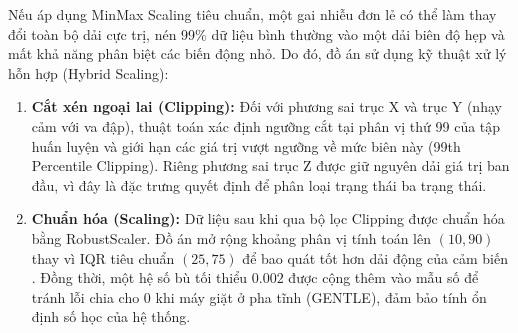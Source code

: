 Nếu áp dụng MinMax Scaling tiêu chuẩn, một gai nhiễu đơn lẻ có thể làm thay đổi toàn bộ dải cực trị, nén 99\% dữ liệu bình thường vào một dải biên độ hẹp và mất khả năng phân biệt các biến động nhỏ. Do đó, đồ án sử dụng kỹ thuật xử lý hỗn hợp (Hybrid Scaling):

\begin{enumerate}
    \item \textbf{Cắt xén ngoại lai (Clipping):} Đối với phương sai trục X và trục Y (nhạy cảm với va đập), thuật toán xác định ngưỡng cắt tại phân vị thứ 99 của tập huấn luyện và giới hạn các giá trị vượt ngưỡng về mức biên này (99th Percentile Clipping). Riêng phương sai trục Z được giữ nguyên dải giá trị ban đầu, vì đây là đặc trưng quyết định để phân loại trạng thái ba trạng thái.

    \item \textbf{Chuẩn hóa (Scaling):} Dữ liệu sau khi qua bộ lọc Clipping được chuẩn hóa bằng RobustScaler. Đồ án mở rộng khoảng phân vị tính toán lên $(10, 90)$ thay vì IQR tiêu chuẩn $(25, 75)$ để bao quát tốt hơn dải động của cảm biến \cite{ref_3_robust_scaler}. Đồng thời, một hệ số bù tối thiểu $0.002$ được cộng thêm vào mẫu số để tránh lỗi chia cho 0 khi máy giặt ở pha tĩnh (GENTLE), đảm bảo tính ổn định số học của hệ thống.
\end{enumerate}





